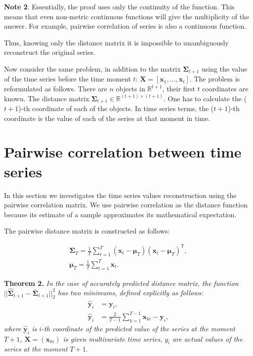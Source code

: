 \documentclass[12pt]{article}
\begin{document}
\textbf{Note 2}. Essentially, the proof uses only the continuity of the function. This means that even non-metric continuous functions will give the multiplicity of the answer. For example, pairwise correlation of series is also a continuous function.

Thus, knowing only the distance matrix it is impossible to unambiguously reconstruct the original series.

Now consider the same problem, in addition to the matrix $\mathbf{\Sigma}_{t+1}$ using the value of the time series before the time moment $t$: $\mathbf{X}=[\mathbf{x}_1, \ldots, \mathbf{x}_{t}]$. The problem is reformulated as follows. There are $n$ objects in $\mathbb{R}^{t+1}$, their first $t$ coordinates are known. The distance matrix $\mathbf{\Sigma}_{t+1} \in \mathbb{R}^{(t+1) \times (t+1)}$. One has to calculate the ($t+1$)-th coordinate of each of the objects. In time series terms, the ($t+1$)-th coordinate is the value of each of the series at that moment in time.

\section{Pairwise correlation between time series}

In this section we investigates the time series values reconstruction using the pairwise correlation matrix. We use pairwise correlation as the distance function because its estimate of a sample approximates its mathematical expectation.

The pairwise distance matrix is constructed as follows:

\begin{subequations}
	\begin{gather*}
		{\mathbf{\Sigma}}_T = \frac{1}{T} \sum_{t=1}^{T} (\mathbf{x}_t - \boldsymbol{\mu}_T)(\mathbf{x}_t - \boldsymbol{\mu}_T)^\mathsf{T},\\
		\boldsymbol{\mu}_T = \frac{1}{T} \sum_{t=1}^{T} \mathbf{x}_t.
		\tag{2} \label{distance_matrix}
	\end{gather*}
\end{subequations}

\textbf{Theorem 2.} \emph{In the case of accurately predicted distance matrix, the function}\\ $||\hat{\mathbf{\Sigma}}_{t+1} - \bar{\mathbf{\Sigma}}_{t+1}||_2^2$ \emph{has two minimums, defined explicitly as follows:}
\begin{align*}
	\hat{\mathbf{y}}_i &= \mathbf{y}_i,\\
	\hat{\mathbf{y}}_i &= \frac{2}{T-1} \sum_{k=1}^{T-1} \mathbf{x}_{ki} - \mathbf{y}_i,
\end{align*}
\emph{where} $\hat{\mathbf{y}}_i$ \emph{is} $i$\emph{-th coordinate of the predicted value of the series at the moment $T+1$, $\mathbf{X}=(\mathbf{x}_{ki})$ is given multivariate time series,} $y_i$ \emph{are actual values of the series at the moment} $T+1$.
\end{document}
